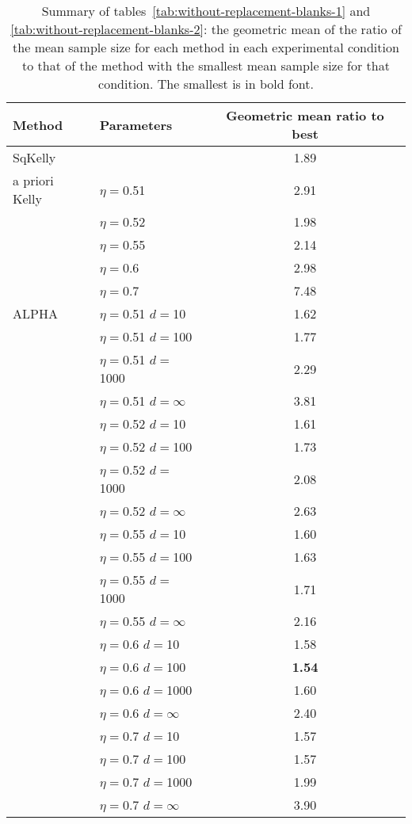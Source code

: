\documentclass[12pt,runningheads]{llncs}
\begin{document}
{\begin{table}
\centering
\tiny
\begin{tabular}{llc}\\ 
Method & Parameters & Geometric mean ratio to best\\
\hline SqKelly & & 1.89 \\ 
 \hline a priori Kelly 
 & $\eta=$0.51 & 2.91 \\
 & $\eta=$0.52 & 1.98 \\
 & $\eta=$0.55 & 2.14 \\
 & $\eta=$0.6 & 2.98 \\
 & $\eta=$0.7 & 7.48 \\
\hline ALPHA 
 & $\eta=$0.51 $d=$10 & 1.62 \\ 
 & $\eta=$0.51 $d=$100 & 1.77 \\ 
 & $\eta=$0.51 $d=$1000 & 2.29 \\ 
 & $\eta=$0.51 $d=\infty$ & 3.81 \\
\cline{2-3}
 & $\eta=$0.52 $d=$10 & 1.61 \\ 
 & $\eta=$0.52 $d=$100 & 1.73 \\ 
 & $\eta=$0.52 $d=$1000 & 2.08 \\ 
 & $\eta=$0.52 $d=\infty$ & 2.63 \\
\cline{2-3}
 & $\eta=$0.55 $d=$10 & 1.60 \\ 
 & $\eta=$0.55 $d=$100 & 1.63 \\ 
 & $\eta=$0.55 $d=$1000 & 1.71 \\ 
 & $\eta=$0.55 $d=\infty$ & 2.16 \\
\cline{2-3}
 & $\eta=$0.6 $d=$10 & 1.58 \\ 
 & $\eta=$0.6 $d=$100 & \bf{1.54} \\ 
 & $\eta=$0.6 $d=$1000 & 1.60 \\ 
 & $\eta=$0.6 $d=\infty$ & 2.40 \\
\cline{2-3}
 & $\eta=$0.7 $d=$10 & 1.57 \\ 
 & $\eta=$0.7 $d=$100 & 1.57 \\ 
 & $\eta=$0.7 $d=$1000 & 1.99 \\ 
 & $\eta=$0.7 $d=\infty$ & 3.90 \end{tabular}
\caption{\protect \label{tab:summary}
Summary of tables~\ref{tab:without-replacement-blanks-1} and \ref{tab:without-replacement-blanks-2}:
the geometric mean of the ratio of the mean sample size for each method in each experimental condition to
that of the method with the smallest mean sample size for that condition.
The smallest is in bold font.
}
\end{table}

}
\end{document}
